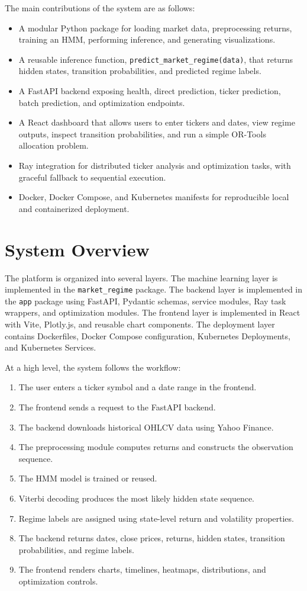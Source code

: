 \documentclass[conference]{IEEEtran}
\begin{document}
The main contributions of the system are as follows:
\begin{itemize}
    \item A modular Python package for loading market data, preprocessing returns, training an HMM, performing inference, and generating visualizations.
    \item A reusable inference function, \texttt{predict\_market\_regime(data)}, that returns hidden states, transition probabilities, and predicted regime labels.
    \item A FastAPI backend exposing health, direct prediction, ticker prediction, batch prediction, and optimization endpoints.
    \item A React dashboard that allows users to enter tickers and dates, view regime outputs, inspect transition probabilities, and run a simple OR-Tools allocation problem.
    \item Ray integration for distributed ticker analysis and optimization tasks, with graceful fallback to sequential execution.
    \item Docker, Docker Compose, and Kubernetes manifests for reproducible local and containerized deployment.
\end{itemize}

\section{System Overview}
The platform is organized into several layers. The machine learning layer is implemented in the \texttt{market\_regime} package. The backend layer is implemented in the \texttt{app} package using FastAPI, Pydantic schemas, service modules, Ray task wrappers, and optimization modules. The frontend layer is implemented in React with Vite, Plotly.js, and reusable chart components. The deployment layer contains Dockerfiles, Docker Compose configuration, Kubernetes Deployments, and Kubernetes Services.

At a high level, the system follows the workflow:
\begin{enumerate}
    \item The user enters a ticker symbol and a date range in the frontend.
    \item The frontend sends a request to the FastAPI backend.
    \item The backend downloads historical OHLCV data using Yahoo Finance.
    \item The preprocessing module computes returns and constructs the observation sequence.
    \item The HMM model is trained or reused.
    \item Viterbi decoding produces the most likely hidden state sequence.
    \item Regime labels are assigned using state-level return and volatility properties.
    \item The backend returns dates, close prices, returns, hidden states, transition probabilities, and regime labels.
    \item The frontend renders charts, timelines, heatmaps, distributions, and optimization controls.
\end{enumerate}
\end{document}
